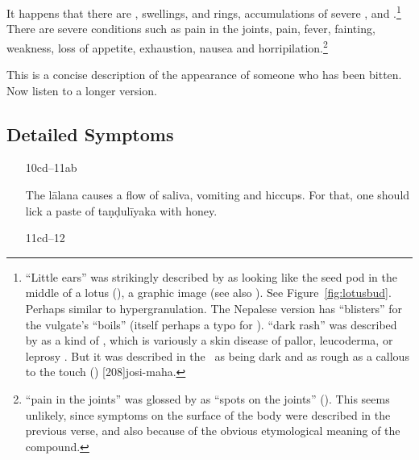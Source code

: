 \begin{translation}
It happens that there are , swellings,
 and rings, accumulations of
severe , 
and .\footnote{\label{karṇika}“Little ears” was strikingly described
    by  as looking like the seed pod in the middle of
    a lotus (), a graphic image (see also
    ).  See Figure~\ref{fig:lotusbud}.  Perhaps similar to 
    hypergranulation. 
    The Nepalese version has  “blisters” for the
    vulgate's  “boils” (itself perhaps a typo for
    ).   “dark rash” was described by
     as a kind of , which is
    variously a skin disease of pallor, leucoderma, or leprosy
    \citep{emme-1984}. But it was described in the \CS\ as being dark
    and as rough as a callous to the touch ()
    [208]{josi-maha}.}  There are severe conditions such
    as pain in the joints, pain, fever, fainting, weakness, loss of
    appetite, exhaustion, nausea and
    horripilation.\footnote{ “pain in the joints” was
        glossed by  as “spots on the joints”
        ().  This seems unlikely, since symptoms on
        the surface of the body were described in the previous verse, and
        also because of the obvious etymological meaning of the
        compound.}
        

This is a concise description of the appearance of someone who has been 
bitten.  Now listen to a longer version. 

\subsection{Detailed Symptoms}

\begin{itemize}
\item[10cd--11ab]

The \Gls{lālana} causes a flow of saliva, vomiting and hiccups.  For that, one 
should lick a paste of \gls{taṇḍulīyaka} with honey. 

\item [11cd--12]


\end{itemize}
\end{translation}
